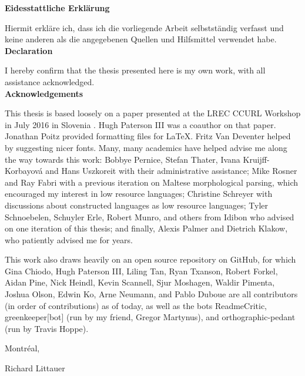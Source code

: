 \documentclass[12pt,a4paper]{article}
\begin{document}


\newpage

\thispagestyle{empty}
\noindent\textbf{Eidesstattliche Erkl\"arung}

\noindent Hiermit erkl\"are ich, dass ich die vorliegende Arbeit selbstst\"andig verfasst und keine anderen als die angegebenen Quellen und Hilfsmittel verwendet habe.\\

\noindent\textbf{Declaration}

\noindent I hereby confirm that the thesis presented here is my own work, with all assistance acknowledged. \\

\noindent\textbf{Acknowledgements}

\noindent This thesis is based loosely on a paper presented at the LREC CCURL Workshop in July 2016 in Slovenia \citep{CCURL}. Hugh Paterson III was a coauthor on that paper. Jonathan Poitz provided formatting files for \LaTeX. Fritz Van Deventer helped by suggesting nicer fonts. Many, many academics have helped advise me along the way towards this work: Bobbye Pernice, Stefan Thater, Ivana Kruijff-Korbayov\'a and Hans Uszkoreit with their administrative assistance; Mike Rosner and Ray Fabri with a previous iteration on Maltese morphological parsing, which encouraged my interest in low resource languages; Christine Schreyer with discussions about constructed languages as low resource languages; Tyler Schnoebelen, Schuyler Erle, Robert Munro, and others from Idibon who advised on one iteration of this thesis; and finally, Alexis Palmer and Dietrich Klakow, who patiently advised me for years.

\noindent This work also draws heavily on an open source repository on GitHub, for which Gina Chiodo, Hugh Paterson III, Liling Tan, Ryan Txanson, Robert Forkel, Aidan Pine, Nick Heindl, Kevin Scannell, Sjur Moshagen, Waldir Pimenta, Joshua Olson, Edwin Ko, Arne Neumann, and Pablo Duboue are all contributors (in order of contributions) as of today, as well as the bots ReadmeCritic, greenkeeper[bot] (run by my friend, Gregor Martynus), and orthographic-pedant (run by Travis Hoppe).

\vspace{1cm}

\noindent Montr\'eal, \thedate

\vspace{1.7cm}

\noindent Richard Littauer
\end{document}
